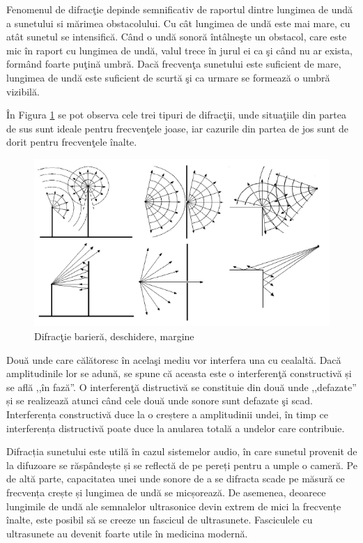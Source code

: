 	
	Fenomenul de difrac\c{t}ie depinde semnificativ de raportul dintre lungimea de und\u{a} a sunetului si m\u{a}rimea obstacolului. Cu c\^{a}t lungimea de und\u{a} este mai mare, cu at\^{a}t sunetul se intensific\u{a}. C\^{a}nd o und\u{a} sonor\u{a} \^{i}nt\^{a}lne\c{s}te un obstacol, care este mic \^{i}n raport cu lungimea de und\u{a}, valul trece \^{i}n jurul ei ca \c{s}i c\^{a}nd nu ar exista, form\^{a}nd foarte pu\c{t}in\u{a} umbr\u{a}. Dac\u{a} frecven\c{t}a sunetului este suficient de mare, lungimea de und\u{a} este suficient de scurt\u{a} \c{s}i ca urmare se formeaz\u{a} o umbr\u{a} vizibil\u{a}.
	 
	
	\^{I}n Figura \ref{Fig3} se pot observa cele trei tipuri de difrac\c{t}ii, unde situa\c{t}iile din partea de sus sunt ideale pentru frecven\c{t}ele joase, iar cazurile din partea de jos sunt de dorit pentru frecven\c{t}ele \^{i}nalte.
	 
	
	\begin{figure}[!htb]
		\centering
		\includegraphics[width=0.8\linewidth]{imagini/difractie.png}
		\caption{Difrac\c{t}ie barier\u{a}, deschidere, margine\cite{elorza}}
		\label{Fig3}
	\end{figure}
	
	Dou\u{a} unde care c\u{a}l\u{a}toresc \^{i}n acela\c{s}i mediu vor interfera una cu cealalt\u{a}. Dac\u{a} amplitudinile lor se adun\u{a}, se spune c\u{a} aceasta este o interferen\c{t}\u{a} constructiv\u{a} și se află ,,în fază''. O interferen\c{t}\u{a} distructiv\u{a} se constituie din două unde ,,defazate'' și se realizeaz\u{a} atunci c\^{a}nd cele dou\u{a} unde sonore sunt defazate \c{s}i scad. Interferența constructivă duce la o creștere a amplitudinii undei, în timp ce interferența distructivă poate duce la anularea totală a undelor care contribuie.
	 
	Difracția sunetului este utilă în cazul sistemelor audio, în care sunetul provenit de la difuzoare se răspândește și se reflectă de pe pereți pentru a umple o cameră. Pe de altă parte, capacitatea unei unde sonore de a se difracta scade pe măsură ce frecvența crește și lungimea de undă se micșorează. De asemenea, deoarece lungimile de undă ale semnalelor ultrasonice devin extrem de mici la frecvențe înalte, este posibil să se creeze un fascicul de ultrasunete. Fasciculele cu ultrasunete au devenit foarte utile în medicina modernă.
	
